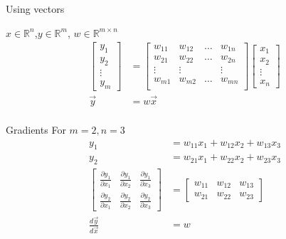 
\begin{frame}{Using vectors}
		\begin{block}{$x \in \mathbb{R}^n$,$y \in \mathbb{R}^m$, $w\in \mathbb{R}^{m \times n}$}
			\begin{align*}
				\begin{bmatrix}
					y_1 \\
					y_2 \\
					\vdots \\
					y_m
				\end{bmatrix} & =  
				\begin{bmatrix}
					w_{11} & w_{12}& \dots & w_{1n}  \\
					w_{21} & w_{22}& \dots & w_{2n}  \\
					\vdots &\vdots &  & \vdots  \\
					w_{m1} & w_{m2}& \dots & w_{mn}  \\
				\end{bmatrix}
			\begin{bmatrix}
				x_1 \\
				x_2 \\
				\vdots \\
				x_n
			\end{bmatrix} \\
		\vec{y} &=w\vec{x} \\
			\end{align*}

		\end{block}
\end{frame}
\begin{frame}{Gradients}
	For $m=2, n=3$
	\begin{align}
		y_1 &= w_{11}x_1 + w_{12}x_2+w_{13}x_3  \\
		y_2 &= w_{21}x_1 + w_{22}x_2+w_{23}x_3  \\ 
		\begin{bmatrix}
			\frac{\partial y_1}{\partial x_1} & 
				\frac{\partial y_1}{\partial x_2}& 
				\frac{\partial y_1}{\partial x_3}  \\
			\frac{\partial y_2}{\partial x_1}  & 
				\frac{\partial y_2}{\partial x_2}  & 
				\frac{\partial y_2}{\partial x_3}  
		\end{bmatrix} &= 
		\begin{bmatrix}
			w_{11} &  w_{12} & 	w_{13} \\
			w_{21} &  w_{22} & 	w_{23} 
		\end{bmatrix} \\
		\frac{d\vec{y}}{d\vec{x}} &=w 
	\end{align}
\end{frame}
